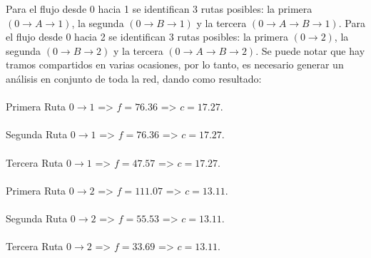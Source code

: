 \documentclass{article}  %
\begin{document}
Para el flujo desde 0 hacia 1 se identifican 3 rutas posibles: la primera \( (0 \rightarrow A \rightarrow 1) \), la segunda \( (0 \rightarrow B \rightarrow 1) \) y la tercera \( (0 \rightarrow A \rightarrow B \rightarrow 1) \). Para el flujo desde 0 hacia 2 se identifican 3 rutas posibles: la primera \( (0 \rightarrow 2) \), la segunda \( (0 \rightarrow B \rightarrow 2) \) y la tercera \( (0 \rightarrow A \rightarrow B \rightarrow 2) \). Se puede notar que hay tramos compartidos en varias ocasiones, por lo tanto, es necesario generar un análisis en conjunto de toda la red, dando como resultado:
\\ \\
Primera Ruta \( 0 \rightarrow 1 \) => \( f = 76.36 \) => \( c = 17.27 \).
\\ \\
Segunda Ruta \( 0 \rightarrow 1 \) => \( f = 76.36 \) => \( c = 17.27 \).
\\ \\
Tercera Ruta \( 0 \rightarrow 1 \) => \( f = 47.57 \) => \( c = 17.27 \).
\\ \\
Primera Ruta \( 0 \rightarrow 2 \) => \( f = 111.07 \) => \( c = 13.11 \).
\\ \\
Segunda Ruta \( 0 \rightarrow 2 \) => \( f = 55.53 \) => \( c = 13.11 \).
\\ \\
Tercera Ruta \( 0 \rightarrow 2 \) => \( f = 33.69 \) => \( c = 13.11 \).
\end{document}
